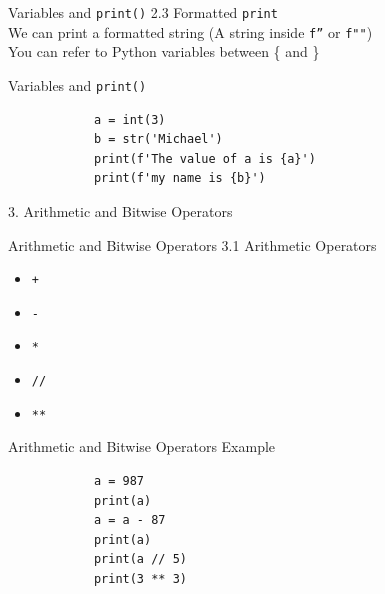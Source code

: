 \documentclass{beamer}
\begin{document}
    \begin{frame}{Variables and \texttt{print()}}
        \color{blue} \Large 2.3 Formatted \texttt{print} \\
        \color{black} \normalsize \vskip 10pt
        We can print a formatted string (A string inside \texttt{f''} or \texttt{f""})\\
        You can refer to Python variables between \{ and \}
    \end{frame}

    \begin{frame}[fragile]{Variables and \texttt{print()}}
        \begin{verbatim}
            a = int(3)
            b = str('Michael')
            print(f'The value of a is {a}')
            print(f'my name is {b}')
        \end{verbatim}
    \end{frame} 

    
    \begin{frame}[plain,c]
        \begin{center}
            {\color{blue} \LARGE 3. Arithmetic and Bitwise Operators}
        \end{center}
        
    \end{frame}
    
    \begin{frame}{Arithmetic and Bitwise Operators}
        \color{blue} \Large 3.1 Arithmetic Operators \\
        
        \color{black} \normalsize \vskip 10pt 
        \begin{itemize}
            \item \texttt{+}
            \item \texttt{-}
            \item \texttt{*}
            \item \texttt{//}
            \item \texttt{**}
        \end{itemize}
    \end{frame}

    \begin{frame}[fragile]{Arithmetic and Bitwise Operators}
        \color{blue} \Large Example \\
        \color{black} \normalsize \vskip 10pt 
        \begin{verbatim}
            a = 987
            print(a)
            a = a - 87
            print(a)
            print(a // 5)
            print(3 ** 3)
        \end{verbatim}
        
    \end{frame}
    
\end{document}

